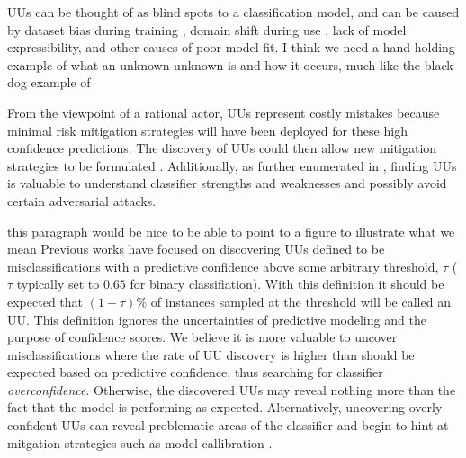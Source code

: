 \documentclass[letterpaper]{article} %
\newcommand{\wdb}[1]{{\color{blue} #1}} %
\begin{document}
UUs can be thought of as blind spots to a classification model, and can be caused by dataset bias during training \citep{stock2017convnets}, domain shift during use \citep{sugiyama2017dataset}, lack of model expressibility, and other causes of poor model fit. \wdb{I think we need a hand holding example of what an unknown unknown is and how it occurs, much like the black dog example of \citep{Lakkaraju2016}}  


From the viewpoint of a rational actor, UUs represent costly mistakes because minimal risk mitigation strategies will have been deployed for these high confidence predictions.  The discovery of UUs could then allow new mitigation strategies to be formulated \citep{Nushi2016a}. Additionally, as further enumerated in \citet{Bansal2018}, finding UUs is valuable to understand classifier strengths and weaknesses and possibly avoid certain adversarial attacks.


\wdb{this paragraph would be nice to be able to point to a figure to illustrate what we mean}
Previous works have focused on discovering UUs defined to be misclassifications with a predictive confidence above some arbitrary threshold, $\tau$ ($\tau$ typically set to $0.65$ for binary classifiation).  With this definition it should be expected that $(1-\tau)$\% of instances sampled at the threshold will be called an UU. This definition ignores the uncertainties of predictive modeling and the purpose of confidence scores.  We believe it is more valuable to uncover misclassifications where the rate of UU discovery is higher than should be expected based on predictive confidence, thus searching for classifier \textit{overconfidence}. Otherwise, the discovered UUs may reveal nothing more than the fact that the model is performing as expected.  Alternatively, uncovering overly confident UUs can reveal problematic areas of the classifier and begin to hint at mitgation strategies such as model callibration \citep{bella2010calibration}.  
\end{document}
